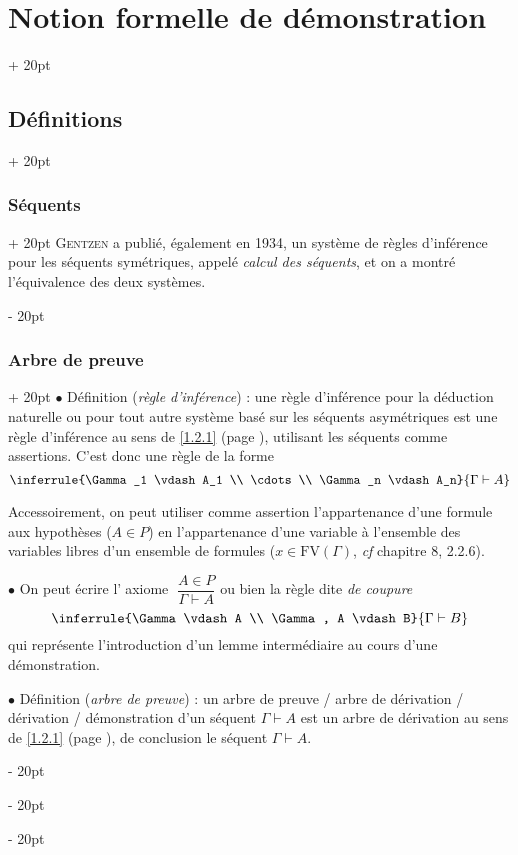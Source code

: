 \documentclass[a4paper, 12pt, twoside]{article}
\newcommand{\simplecit}[1]{\guillemotleft$\;$#1$\;$\guillemotright}
\newcommand{\ind}[1][20pt]{\advance\leftskip + #1}
\newcommand{\deind}[1][20pt]{\advance\leftskip - #1}
\newenvironment{indt}[2][20pt]{#2 \par \ind[#1]}{\par \deind} %
\begin{document}
\begin{indt}{\section{Notion formelle de démonstration}}
\begin{indt}{\subsection{Définitions}}
\begin{indt}{\subsubsection{Séquents}}
                \textsc{Gentzen} a publié, également en 1934, un système de règles d'inférence pour les séquents symétriques, appelé \emph{calcul des séquents}, et on a montré l'équivalence des deux systèmes.
            \end{indt}

            \vspace{12pt}
            
            \begin{indt}{\subsubsection{Arbre de preuve}}
                $\bullet$ Définition (\emph{règle d'inférence}) : une règle d'inférence pour la déduction naturelle ou pour tout autre système basé sur les séquents asymétriques est une règle d'inférence au sens de \ref{1.2.1} (page \pageref{1.2.1}), utilisant les séquents comme assertions.
                C'est donc une règle de la forme
                \[
                    \inferrule{\Gamma_1 \vdash A_1 \\ \cdots \\ \Gamma_n \vdash A_n}{\Gamma \vdash A}
                \]

                Accessoirement, on peut utiliser comme assertion l'appartenance d'une formule aux hypothèses ($A \in P$) en l'appartenance d'une variable à l'ensemble des variables libres d'un ensemble de formules ($x \in \mathrm{FV}(\Gamma)$, \textit{cf} chapitre 8, 2.2.6).

                \vspace{12pt}
                
                $\bullet$ On peut écrire l'\simplecit{axiome} $\dfrac{A \in P}{\Gamma \vdash A}$ ou bien la règle dite \emph{de coupure}
                \[
                    \inferrule{\Gamma \vdash A \\ \Gamma, A \vdash B}{\Gamma \vdash B}
                \]
                qui représente l'introduction d'un lemme intermédiaire au cours d'une démonstration.

                \vspace{12pt}
                
                $\bullet$ Définition (\emph{arbre de preuve}) : un arbre de preuve / arbre de dérivation / dérivation / démonstration d'un séquent $\Gamma \vdash A$ est un arbre de dérivation au sens de \ref{1.2.1} (page \pageref{1.2.1}), de conclusion le séquent $\Gamma \vdash A$.


\end{indt}
\end{indt}
\end{indt}
\end{document}

